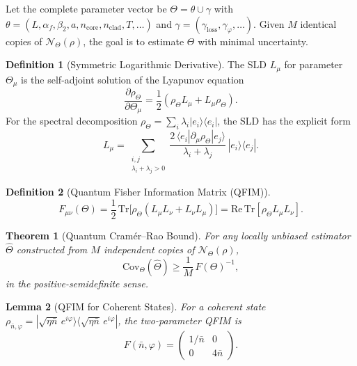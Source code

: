 \documentclass[journal,twocolumn]{IEEEtran}
\theoremstyle{definition}
\newtheorem{definition}{Definition}[section]
\theoremstyle{plain}
\newtheorem{theorem}{Theorem}[section]
\newtheorem{lemma}[theorem]{Lemma}
\newcommand{\Tr}{\mathrm{Tr}}
\newcommand{\alphaf}{\alpha_{f}}
\begin{document}
Let the complete parameter vector be $\Theta = \theta \cup \gamma$
with $\theta = (L,\alphaf,\beta_2,a,n_{\mathrm{core}},
n_{\mathrm{clad}},T,\ldots)$ and $\gamma = (\gamma_{\mathrm{loss}},
\gamma_\varphi, \ldots)$.  Given $M$ identical copies of
$\mathcal{N}_\Theta(\rho)$, the goal is to estimate $\Theta$ with
minimal uncertainty.

\begin{definition}[Symmetric Logarithmic Derivative]
The SLD $L_\mu$ for parameter $\Theta_\mu$ is the self-adjoint
solution of the Lyapunov equation
\begin{equation}
  \frac{\partial \rho_\Theta}{\partial \Theta_\mu}
  = \frac{1}{2}(\rho_\Theta L_\mu + L_\mu \rho_\Theta).
  \label{eq:sld_def}
\end{equation}
For the spectral decomposition $\rho_\Theta =
\sum_i \lambda_i |e_i\rangle\langle e_i|$, the SLD has the explicit form
\begin{equation}
  L_\mu = \sum_{\substack{i,j \\ \lambda_i + \lambda_j > 0}}
  \frac{2\,\langle e_i|\partial_\mu\rho_\Theta|e_j\rangle}
       {\lambda_i + \lambda_j}\,|e_i\rangle\langle e_j|.
  \label{eq:SLD}
\end{equation}
\end{definition}

\begin{definition}[Quantum Fisher Information Matrix (QFIM)]
\begin{equation}
  F_{\mu\nu}(\Theta) = \frac{1}{2}\,\Tr\bigl[\rho_\Theta
    (L_\mu L_\nu + L_\nu L_\mu)\bigr]
  = \mathrm{Re}\,\Tr[\rho_\Theta L_\mu L_\nu].
  \label{eq:QFIM}
\end{equation}
\end{definition}

\begin{theorem}[Quantum Cram\'{e}r--Rao Bound]
\label{thm:QCRB}
For any locally unbiased estimator $\hat\Theta$ constructed from
$M$ independent copies of $\mathcal{N}_\Theta(\rho)$,
\begin{equation}
  \mathrm{Cov}_\Theta(\hat\Theta) \ge \frac{1}{M}\,F(\Theta)^{-1},
  \label{eq:QCRB}
\end{equation}
in the positive-semidefinite sense.
\end{theorem}

\begin{lemma}[QFIM for Coherent States]
\label{lem:qfim_coherent}
For a coherent state $\rho_{\bar n, \varphi} =
|\sqrt{\eta\bar n}\,e^{i\varphi}\rangle
\langle\sqrt{\eta\bar n}\,e^{i\varphi}|$, the two-parameter QFIM is
\begin{equation}
  F(\bar n, \varphi) =
  \begin{pmatrix} 1/\bar n & 0 \\ 0 & 4\bar n \end{pmatrix}.
  \label{eq:qfim_coherent}
\end{equation}
\end{lemma}
\end{document}
